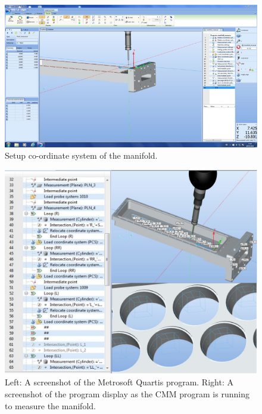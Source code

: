 \begin{figure}[ht]
\centering
\includegraphics{Figures/cmm2}
\decoRule
\caption{Setup co-ordinate system of the manifold.}
\label{fig:cmm2}
\end{figure}

\begin{figure}[ht]
\centering
\includegraphics[scale=0.5]{Figures/ccmprogram.png}
\decoRule
\caption{Left: A screenshot of the Metrosoft Quartis program. Right: A screenshot of the program display as the CMM program is running to measure the manifold.}
\label{fig:cmmprogram}
\end{figure}

